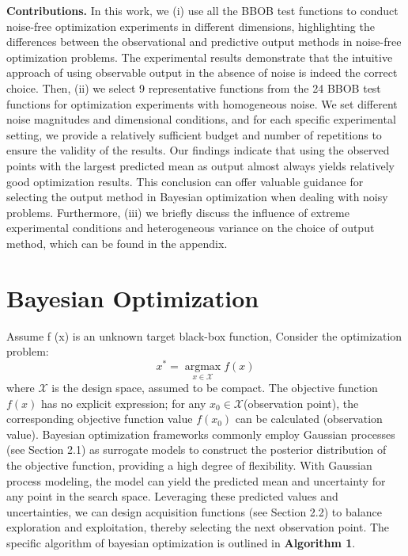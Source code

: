 \documentclass{article}
\begin{document}
\hspace{2em}
\textbf{Contributions.} In this work, we (i) use all the BBOB test functions to conduct noise-free optimization experiments in different dimensions, highlighting the differences between the observational and predictive output methods in noise-free optimization problems. The experimental results demonstrate that the intuitive approach of using observable output in the absence of noise is indeed the correct choice. Then, (ii) we select 9 representative functions from the 24 BBOB test functions for optimization experiments with homogeneous noise. We set different noise magnitudes and dimensional conditions, and for each specific experimental setting, we provide a relatively sufficient budget and number of repetitions to ensure the validity of the results. Our findings indicate that using the observed points with the largest predicted mean as output almost always yields relatively good optimization results. This conclusion can offer valuable guidance for selecting the output method in Bayesian optimization when dealing with noisy problems. Furthermore, (iii) we briefly discuss the influence of extreme experimental conditions and heterogeneous variance on the choice of output method, which can be found in the appendix.


\section{Bayesian Optimization}
\hspace{2em}Assume f (x) is an unknown target black-box function, Consider the optimization problem:
\begin{equation}\label{eq1}
	x^* = \mathop{\arg\max}\limits_{x \in \mathcal{X}} f(x)
\end{equation}
where $\mathcal{X}$ is the design space, assumed to be compact. The objective function $f(x)$ has no explicit expression; for any  $x_0 \in \mathcal{X}$(observation point), the corresponding objective function value $f(x_0)$ can be calculated (observation value). Bayesian optimization frameworks commonly employ Gaussian processes (see Section 2.1) as surrogate models to construct the posterior distribution of the objective function, providing a high degree of flexibility. With Gaussian process modeling, the model can yield the predicted mean and uncertainty for any point in the search space. Leveraging these predicted values and uncertainties, we can design acquisition functions (see Section 2.2) to balance exploration and exploitation, thereby selecting the next observation point. The specific algorithm of bayesian optimization is outlined in \textbf{Algorithm 1}.
\end{document}
